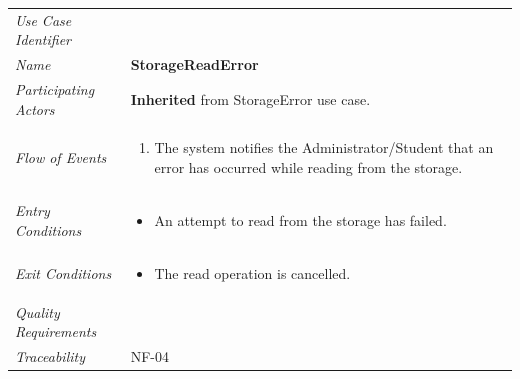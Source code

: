 \documentclass[12pt,letterpaper]{article}
\begin{document}
\begin{center}
	\begin{tabu} to 
		\toprule
		Use Case Identifier & \storagereaderror{} \\
		Name & {\bf StorageReadError} \\
		Participating Actors & \textbf{Inherited} from StorageError use case. \\
		Flow of Events & 
		\begin{minipage}[t]{\linewidth}
		    \begin{enumerate}
			    \item The system notifies the Administrator/Student that an error has occurred while reading from the storage.
			\end{enumerate}
		\end{minipage} \\

		Entry Conditions &
		\begin{minipage}[t]{\linewidth}
			\begin{itemize}
			    \item An attempt to read from the storage has failed.
	        \end{itemize}
		\end{minipage} \\

		Exit Conditions &
		\begin{minipage}[t]{\linewidth}
			\begin{itemize}
			    \item The read operation is cancelled.
	        \end{itemize}
		\end{minipage} \\

		Quality Requirements & \\

		Traceability & NF-04 \\
		\toprule
	\end{tabu}
\end{center}
\end{document}
